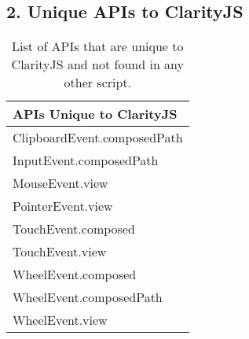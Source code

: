 \documentclass{article}
\begin{document}
\newpage

\subsection*{2. Unique APIs to ClarityJS}

\begin{table}[h]
\centering
\begin{tabular}{|l|}
\hline
\textbf{APIs Unique to ClarityJS} \\
\hline
ClipboardEvent.composedPath \\
InputEvent.composedPath \\
MouseEvent.view \\
PointerEvent.view \\
TouchEvent.composed \\
TouchEvent.view \\
WheelEvent.composed \\
WheelEvent.composedPath \\
WheelEvent.view \\

\hline
\end{tabular}
\caption{List of APIs that are unique to ClarityJS and not found in any other script.}
\end{table}
\end{document}
